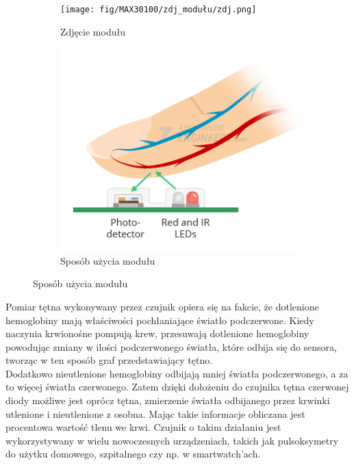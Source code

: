 \documentclass[11pt, a4paper]{article}
\begin{document}
\begin{figure}[h]
\centering
\begin{subfigure}{.5\textwidth}
\centering
\texttt{[image: fig/MAX30100/zdj\_modułu/zdj.png]}
\caption{Zdjęcie modułu}
\label{fig:_zdjecie_modulu}
\end{subfigure}%
\begin{subfigure}{.5\textwidth}
\centering
\includegraphics[width=.6\linewidth]{fig/MAX30100/zasada_dzialania/zasada_dzial.png}
\caption{Sposób użycia modułu}
\label{fig:_schemat_modulu}
\end{subfigure}
\label{fig:modul}
\end{figure}
\vspace{0.5cm}

Pomiar tętna wykonywany przez czujnik opiera się na fakcie, że dotlenione hemoglobiny mają właściwości pochłaniające światło podczerwone. Kiedy naczynia krwionośne pompują krew, przesuwają dotlenione hemoglobiny powodując zmiany w ilości podczerwonego światła, które odbija się do sensora, tworząc w ten sposób graf przedstawiający tętno. \\
Dodatkowo nieutlenione hemoglobiny odbijają mniej światła podczerwonego, a za to więcej światła czerwonego. Zatem dzięki dołożeniu do czujnika tętna czerwonej diody możliwe jest oprócz tętna, zmierzenie światła odbijanego przez krwinki utlenione i nieutlenione z osobna. Mając takie informacje obliczana jest procentowa wartość tlenu we krwi. 
Czujnik o takim działaniu jest wykorzystywany w wielu nowoczesnych urządzeniach, takich jak pulsoksymetry do użytku domowego, szpitalnego czy np. w smartwatch'ach. 
\end{document}
